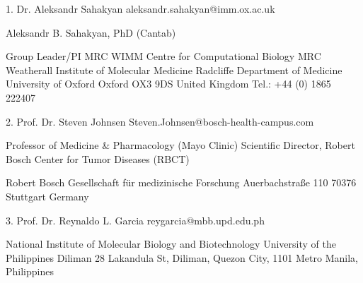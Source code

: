 1. 
Dr. Aleksandr Sahakyan 
aleksandr.sahakyan@imm.ox.ac.uk

Aleksandr B. Sahakyan, PhD (Cantab)

Group Leader/PI
MRC WIMM Centre for Computational Biology
MRC Weatherall Institute of Molecular Medicine
Radcliffe Department of Medicine
University of Oxford
Oxford OX3 9DS
United Kingdom
Tel.: +44 (0) 1865 222407

2. 
Prof. Dr. Steven Johnsen
Steven.Johnsen@bosch-health-campus.com

Professor of Medicine & Pharmacology (Mayo Clinic)
Scientific Director, Robert Bosch Center for Tumor Diseases (RBCT)

Robert Bosch Gesellschaft für medizinische Forschung
Auerbachstraße 110
70376 Stuttgart
Germany

3. 
Prof. Dr. Reynaldo L. Garcia
reygarcia@mbb.upd.edu.ph

National Institute of Molecular Biology and Biotechnology
University of the Philippines Diliman
28 Lakandula St, Diliman, Quezon City, 1101 Metro Manila, Philippines